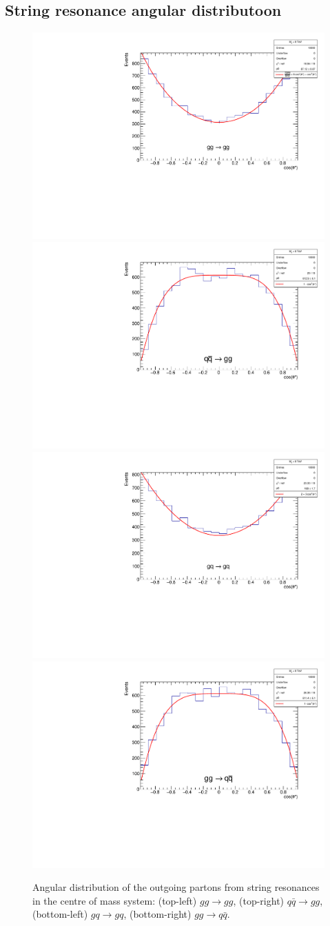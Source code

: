 \subsection{String resonance angular distributoon}

\begin{figure}[htb]
\begin{center}
\includegraphics[width=0.45\linewidth]{../figures/strings/angle_gg_gg}
\includegraphics[width=0.45\linewidth]{../figures/strings/angle_qq-bar_gg}
\includegraphics[width=0.45\linewidth]{../figures/strings/angle_gq_gq}
\includegraphics[width=0.45\linewidth]{../figures/strings/angle_gg_qq-bar}
\end{center}
\caption{Angular distribution of the outgoing partons from string
resonances in the centre of mass system: 
(top-left) $gg\to gg$,
(top-right) $q\bar{q}\to gg$,
(bottom-left) $gq\to gq$,
(bottom-right) $gg\to q\bar{q}$.}
\label{fig:stringangle}
\end{figure}

